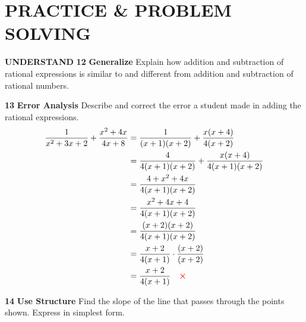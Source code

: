 \documentclass{article}
\newenvironment{practice}[2]{\textbf{#1}\quad}{\par}
\newcommand{\answer}[1]{}
\begin{document}
\section*{PRACTICE \& PROBLEM SOLVING}
\textbf{UNDERSTAND}
\begin{practice}{12}{unknown}
\textbf{Generalize} Explain how addition and subtraction of rational expressions is similar to and different from addition and subtraction of rational numbers.
\answer{}
\end{practice}

\begin{practice}{13}{unknown}
\textbf{Error Analysis} Describe and correct the error a student made in adding the rational expressions.
\begin{align*}
\frac{1}{x^2 + 3x + 2} + \frac{x^2 + 4x}{4x + 8} &= \frac{1}{(x + 1)(x + 2)} + \frac{x(x + 4)}{4(x + 2)} \\
&= \frac{4}{4(x + 1)(x + 2)} + \frac{x(x + 4)}{4(x + 1)(x + 2)} \\
&= \frac{4 + x^2 + 4x}{4(x + 1)(x + 2)} \\
&= \frac{x^2 + 4x + 4}{4(x + 1)(x + 2)} \\
&= \frac{(x + 2)(x + 2)}{4(x + 1)(x + 2)} \\
&= \frac{x + 2}{4(x + 1)} \cdot \frac{(x + 2)}{(x + 2)} \\
&= \frac{x + 2}{4(x + 1)} \quad {\color{red} \boldsymbol{\times}}
\end{align*}
\answer{}
\end{practice}

\begin{practice}{14}{unknown}
\textbf{Use Structure} Find the slope of the line that passes through the points shown. Express in simplest form.
\begin{center}
\end{center}
\answer{}
\end{practice}
\end{document}
